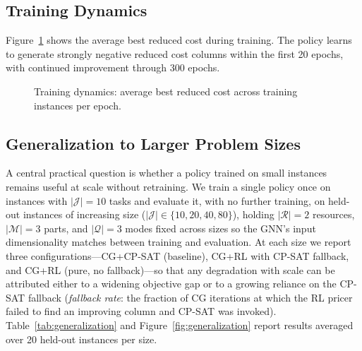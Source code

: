 \documentclass[11pt]{article}
\newcommand{\calJ}{\mathcal{J}}
\newcommand{\calM}{\mathcal{M}}
\newcommand{\calR}{\mathcal{R}}
\newcommand{\calQ}{\mathcal{Q}}
\begin{document}
\subsection{Training Dynamics}

Figure~\ref{fig:training} shows the average best reduced cost during training.
The policy learns to generate strongly negative reduced cost columns within the first 20 epochs, with continued improvement through 300 epochs.

\begin{figure}[h]
\centering
\caption{Training dynamics: average best reduced cost across training instances per epoch.}
\label{fig:training}
\end{figure}

\subsection{Generalization to Larger Problem Sizes}\label{sec:generalization}

A central practical question is whether a policy trained on small instances remains useful at scale without retraining.
We train a single policy once on instances with $|\calJ|=10$ tasks and evaluate it, with no further training, on held-out instances of increasing size ($|\calJ| \in \{10, 20, 40, 80\}$), holding $|\calR|=2$ resources, $|\calM|=3$ parts, and $|\calQ|=3$ modes fixed across sizes so the GNN's input dimensionality matches between training and evaluation.
At each size we report three configurations---CG+CP-SAT (baseline), CG+RL with CP-SAT fallback, and CG+RL (pure, no fallback)---so that any degradation with scale can be attributed either to a widening objective gap or to a growing reliance on the CP-SAT fallback (\emph{fallback rate}: the fraction of CG iterations at which the RL pricer failed to find an improving column and CP-SAT was invoked).
Table~\ref{tab:generalization} and Figure~\ref{fig:generalization} report results averaged over 20 held-out instances per size.
\end{document}
